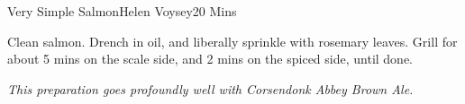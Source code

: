 \begin{recipe}{Very Simple Salmon}{Helen Voysey}{20 Mins}

  Clean salmon. Drench in oil, and liberally sprinkle with rosemary
  leaves. Grill for about 5 mins on the scale side, and 2 mins on the spiced
  side, until done.
\end{recipe}

\textit{This preparation goes profoundly well with Corsendonk Abbey Brown
  Ale.}
